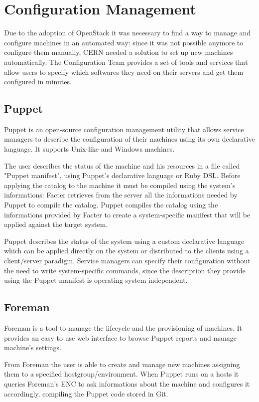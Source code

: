 \section{Configuration Management}

Due to the adoption of OpenStack it was necessary to find a way to manage
and configure machines in an automated way: since it was not possible
anymore to configure them manually, CERN needed a solution to set up new
machines automatically. The Configuration Team provides a set of tools and
services that allow users to specify which softwares they need on their
servers and get them configured in minutes.

\subsection{Puppet}

Puppet is an open-source configuration management utility that allows
service managers to describe the configuration of their machines using its
own declarative language. It supports Unix-like and Windows machines.

The user describes the status of the machine and his resources in a file
called "Puppet manifest", using Puppet's declarative language or Ruby DSL.
Before applying the catalog to the machine it must be compiled using the
system's informations: Facter retrieves from the server all the
informations needed by Puppet to compile the catalog. Puppet compiles the
catalog using the informations provided by Facter to create
a system-specific manifest that will be applied against the target system.

Puppet describes the status of the system using a custom declarative
language which can be applied directly on the system or distributed to the
clients using a client/server paradigm. Service managers can specify their
configuration without the need to write system-specific commands, since
the description they provide using the Puppet manifest is operating system
independent.

\subsection{Foreman}

Foreman is a tool to manage the lifecycle and the provisioning of
machines. It provides an easy to use web interface to browse Puppet
reports and manage machine's settings.

From Foreman the user is able to create and manage new machines assigning
them to a specified hostgroup/environment. When Puppet runs on a hosts it
queries Foreman's ENC to ask informations about the machine and configures
it accordingly, compiling the Puppet code stored in Git.

